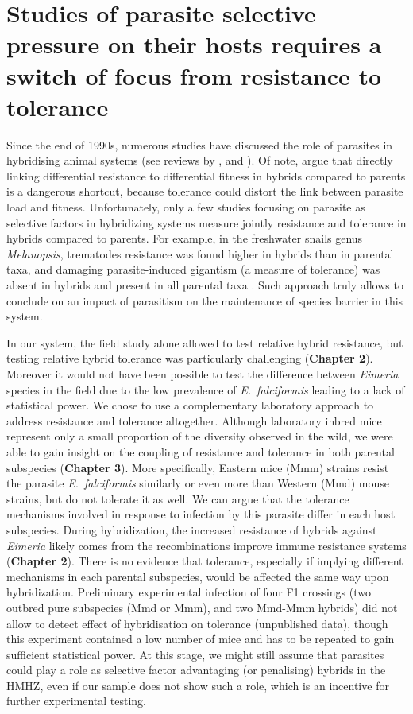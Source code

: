 \section{Studies of parasite selective pressure on their hosts requires a switch of focus from resistance to tolerance}
Since the end of 1990s, numerous studies have discussed the role of parasites in hybridising animal systems (see reviews by \cite{fritz_resistance_1999}, \cite{karvonen_role_2012} and \cite{theodosopoulos_parasites_2019}). Of note, \cite{baird_shifting_2019} argue that directly linking differential resistance to differential fitness in hybrids compared to parents is a dangerous shortcut, because tolerance could distort the link between parasite load and fitness. Unfortunately, only a few studies focusing on parasite as selective factors in hybridizing systems measure jointly resistance and tolerance in hybrids compared to parents. For example, in the freshwater snails genus \textit{Melanopsis}, trematodes resistance was found higher in hybrids than in parental taxa, and damaging parasite-induced gigantism (a measure of tolerance) was absent in hybrids and present in all parental taxa \citep{guttel_maintenance_2014}. Such approach truly allows to conclude on an impact of parasitism on the maintenance of species barrier in this system. 
\par
In our system, the field study alone allowed to test relative hybrid resistance, but testing relative hybrid tolerance was particularly challenging (\textbf{Chapter 2}). Moreover it would not have been possible to test the difference between \textit{Eimeria} species in the field due to the low prevalence of \textit{E.~falciformis} leading to a lack of statistical power. We chose to use a complementary laboratory approach to address resistance and tolerance altogether. Although laboratory inbred mice represent only a small proportion of the diversity observed in the wild, we were able to gain insight on the coupling of resistance and tolerance in both parental subspecies (\textbf{Chapter 3}). More specifically, Eastern mice (Mmm) strains resist the parasite \textit{E.~falciformis} similarly or even more than Western (Mmd) mouse strains, but do not tolerate it as well. We can argue that the tolerance mechanisms involved in response to infection by this parasite differ in each host subspecies. During hybridization, the increased resistance of hybrids against \textit{Eimeria} likely comes from the recombinations improve immune resistance systems (\textbf{Chapter 2}). There is no evidence that tolerance, especially if implying different mechanisms in each parental subspecies, would be affected the same way upon hybridization. Preliminary experimental infection of four F1 crossings (two outbred pure subspecies (Mmd or Mmm), and two Mmd-Mmm hybrids) did not allow to detect effect of hybridisation on tolerance (unpublished data), though this experiment contained a low number of mice and has to be repeated to gain sufficient statistical power. At this stage, we might still assume that parasites could play a role as selective factor advantaging (or penalising) hybrids in the HMHZ, even if our sample does not show such a role, which is an incentive for further experimental testing.

